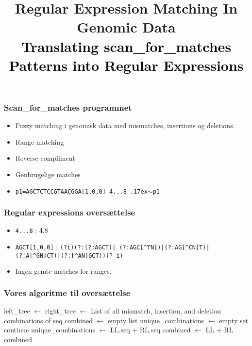 \documentclass{beamer}
\title{
  Regular Expression Matching In Genomic Data \\
  \textcolor{black}{\tiny{Translating scan\_for\_matches Patterns into Regular Expressions}}
}
\date{}
\newcommand*\Let[2]{\State #1 $\gets$ #2}
\newcommand*\Returns[1]{\State \Return #1}
\begin{document}
\frame{\titlepage}

\begin{frame}
    \frametitle{Scan\_for\_matches programmet}
    
    \begin{itemize}
   		\item Fuzzy matching i genomisk data med mismatches, insertions og deletions.
   		\item Range matching
   		\item Reverse compliment
   		\item Genbrugelige matches
   		\item \texttt{p1=AGCTCTCCGTAACGGA[1,0,0] 4...8 {\raise.17ex\hbox{$\scriptstyle\mathtt{\sim}$}}p1}
	\end{itemize}    
   
\end{frame}

\begin{frame}
	\frametitle{Regular expressions oversættelse}
	
	\begin{itemize}
		\item \texttt{4...8} : \.{4,8}
		\item \texttt{AGCT[1,0,0]} : \texttt{(?i)(?:(?:AGCT)|
		(?:AGC[\^{}TN])|(?:AG[\^{}CN]T)|
		(?:A[\^{}GN]CT)|(?:[\^{}AN]GCT))(?-i)}
		\item Ingen gemte matches for ranges.
	\end{itemize}
\end{frame}

\begin{frame}
	\frametitle{Vores algoritme til oversættelse}
	
\begin{algorithm}[H]
\tiny
  	\begin{algorithmic}[1]
    			\Let{left\_tree}{} \label{alg:divide:leftT}
    			\Let{right\_tree}{} \label{alg:divide:rightT}
    		\Else
    			\Returns{List of all mismatch, insertion, and deletion combinations of seq} \label{alg:divide:conquer}
    		\EndIf
    		\State
    		\Let{combined}{empty list}
    		\Let{unique\_combinations}{empty set}
    		 
    			 \label{alg:divide:inner} 
    				 \label{alg:divide:invariant1}
    					\State continue
    				\EndIf
    				 \label{alg:divide:invariant2}
    					\Let{unique\_combinations}{LL.seq + RL.seq}
    					\Let{combined}{LL + RL}
    				\EndIf
    			\EndFor
    		\EndFor
    		\Returns{combined}
    		\EndFunction
  	\end{algorithmic}
\end{algorithm}

\end{frame}
\end{document}
